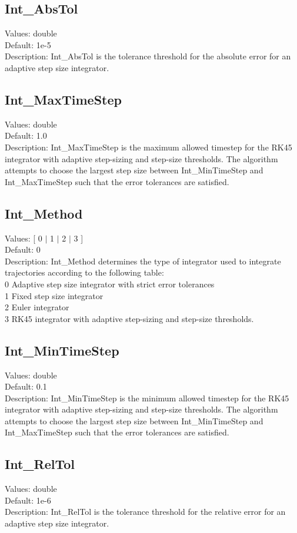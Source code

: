 \documentclass[11pt]{article}
\begin{document}
\subsection{Int\_AbsTol}
Values:   double \\
Default:  1e-5\\
Description:  Int\_AbsTol is the tolerance threshold for the absolute error for an adaptive step size integrator.

\subsection{Int\_MaxTimeStep}
Values:   double \\
Default:  1.0\\
Description:  Int\_MaxTimeStep is the maximum allowed timestep for the RK45 integrator with adaptive step-sizing and step-size thresholds.  The algorithm attempts to choose the largest step size between Int\_MinTimeStep and Int\_MaxTimeStep such that the error tolerances are satisfied.

\subsection{Int\_Method}
Values:   [ 0 $|$ 1 $|$ 2 $|$ 3 ] \\
Default:  0\\
Description: Int\_Method determines the type of integrator used to integrate trajectories according to the following table:\\
0	Adaptive step size integrator with strict error tolerances\\
1	Fixed step size integrator\\
2	Euler integrator\\
3	RK45 integrator with adaptive step-sizing and step-size thresholds.\\

\subsection{Int\_MinTimeStep}
Values:   double \\
Default:  0.1\\
Description:  Int\_MinTimeStep is the minimum allowed timestep for the RK45 integrator with adaptive step-sizing and step-size thresholds.  The algorithm attempts to choose the largest step size between Int\_MinTimeStep and Int\_MaxTimeStep such that the error tolerances are satisfied.

\subsection{Int\_RelTol}
Values:   double \\
Default:  1e-6\\
Description:  Int\_RelTol is the tolerance threshold for the relative error for an adaptive step size integrator.
\end{document}
